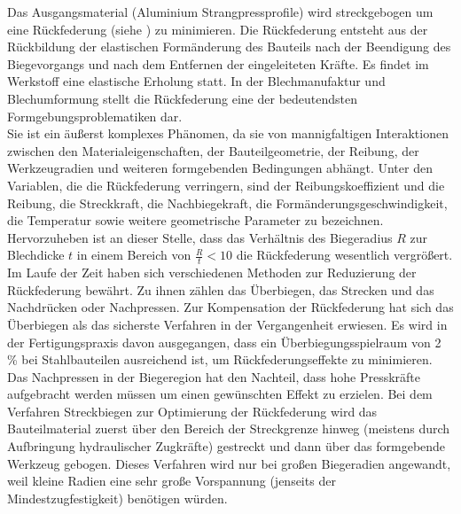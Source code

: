 \documentclass[12pt,a4paper,parskip,twoside,BCOR5mm,headsepline]{scrartcl}
\begin{document}
  
Das Ausgangsmaterial (Aluminium Strangpressprofile) wird streckgebogen um eine Rückfederung (siehe ) zu minimieren.  Die Rückfederung entsteht aus der Rückbildung der elastischen Formänderung des Bauteils nach der Beendigung des Biegevorgangs und nach dem Entfernen der eingeleiteten Kräfte. Es findet im Werkstoff eine elastische Erholung statt. In der Blechmanufaktur und Blechumformung stellt die Rückfederung eine der bedeutendsten Formgebungsproblematiken dar.
\\

 Sie ist ein äußerst komplexes Phänomen, da sie von mannigfaltigen Interaktionen zwischen den Materialeigenschaften, der Bauteilgeometrie, der Reibung,  der Werkzeugradien und weiteren formgebenden Bedingungen abhängt. Unter den Variablen, die die Rückfederung verringern, sind der Reibungskoeffizient und die Reibung, die Streckkraft, die Nachbiegekraft, die Formänderungsgeschwindigkeit, die Temperatur sowie weitere geometrische Parameter zu bezeichnen. Hervorzuheben ist an dieser Stelle, dass das Verhältnis des Biegeradius $ R $ zur Blechdicke $ t $ in einem Bereich von $ \frac{R}{t} < 10 $ die Rückfederung wesentlich vergrößert. Im Laufe der Zeit haben sich verschiedenen Methoden zur Reduzierung der Rückfederung bewährt. Zu ihnen zählen das Überbiegen, das Strecken und das Nachdrücken oder Nachpressen. Zur Kompensation der Rückfederung hat sich das Überbiegen als das sicherste Verfahren in der Vergangenheit erwiesen. Es wird in der Fertigungspraxis davon ausgegangen, dass ein Überbiegungsspielraum von 2 \%  bei Stahlbauteilen ausreichend ist, um Rückfederungseffekte zu minimieren.\\ Das Nachpressen in der Biegeregion hat den Nachteil, dass hohe Presskräfte aufgebracht werden müssen um einen gewünschten Effekt zu erzielen. Bei dem Verfahren  Streckbiegen zur Optimierung der Rückfederung wird das Bauteilmaterial zuerst über den Bereich der Streckgrenze hinweg (meistens durch Aufbringung hydraulischer Zugkräfte) gestreckt und dann über das formgebende Werkzeug gebogen. Dieses Verfahren wird nur bei großen Biegeradien angewandt, weil kleine Radien eine sehr große Vorspannung (jenseits der Mindestzugfestigkeit) benötigen würden. \autocite[16-19]{hmp}\\  
 
\end{document}
